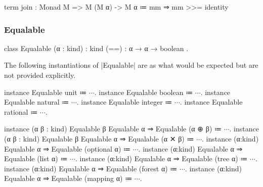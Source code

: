 \begin{program}
term join : Monad M => M (M α) -> M α
  ≔ mm ⇒ mm >>= identity
\end{program}

\subsubsection{Equalable}

\begin{program}[caption={Equalable}]
class Equalable (α : kind) : kind
  { (==) : α → α → boolean }.
\end{program}

The following instantiations of \code|Equalable| are as what would be expected but are not provided explicitly.

\begin{program}[caption={Equalable instances}]
instance Equalable unit ≔ {$\cdots$}.
instance Equalable boolean ≔ {$\cdots$}.
instance Equalable natural ≔ {$\cdots$}.
instance Equalable integer ≔ {$\cdots$}.
instance Equalable rational ≔ {$\cdots$}.

instance (α β : kind) {Equalable β} {Equalable α} ⇒ Equalable (α ⊕ β)
  ≔ {$\cdots$}.
instance (α β : kind) {Equalable β} {Equalable α} ⇒ Equalable (α ✕ β)
  ≔ {$\cdots$}.
instance (α:kind) {Equalable α} ⇒ Equalable (optional α) ≔ {$\cdots$}.
instance (α:kind) {Equalable α} ⇒ Equalable (list α) ≔ {$\cdots$}.
instance (α:kind) {Equalable α} ⇒ Equalable (tree α) ≔ {$\cdots$}.
instance (α:kind) {Equalable α} ⇒ Equalable (forest α) ≔ {$\cdots$}.
instance (α:kind) {Equalable α} ⇒ Equalable (mapping α) ≔ {$\cdots$}.
\end{program}
